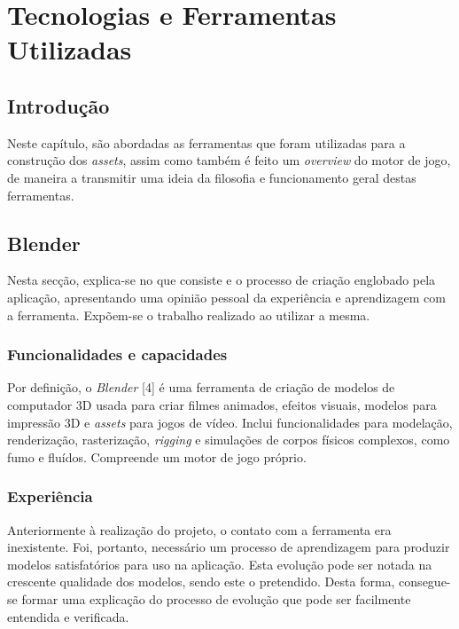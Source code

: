 \chapter{Tecnologias e Ferramentas Utilizadas}
\label{chap:tecnologias_ferramentas_utilizadas}

\section{Introdução}
\label{chap3:sec:intro}
Neste capítulo, são abordadas as ferramentas que foram utilizadas para a construção dos \textit{assets}, assim como também é feito um \textit{overview} do motor de jogo, de maneira a transmitir uma ideia da filosofia e funcionamento geral destas ferramentas.


\section{Blender}
\label{chap3:sec:blender}
Nesta secção, explica-se no que consiste e o processo de criação englobado pela aplicação, apresentando uma opinião pessoal da experiência e aprendizagem com a ferramenta. Expõem-se o trabalho realizado ao utilizar a mesma.

\subsection{Funcionalidades e capacidades}
\label{chap3:subsec:funcionalidades}
Por definição, o \emph{Blender} [4] é uma ferramenta de criação de modelos de computador 3D usada para criar filmes animados, efeitos visuais, modelos para impressão 3D e \textit{assets} para jogos de vídeo.
Inclui funcionalidades para modelação, renderização, rasterização, \textit{rigging} e simulações de corpos físicos complexos, como fumo e fluídos. Compreende um motor de jogo próprio.

\subsection{Experiência}
\label{chap3:subsec:experiencia}
Anteriormente à realização do projeto, o contato com a ferramenta era inexistente. Foi, portanto, necessário um processo de aprendizagem para produzir modelos satisfatórios para uso na aplicação. Esta evolução pode ser notada na crescente qualidade dos modelos, sendo este o pretendido. Desta forma, consegue-se formar uma explicação do processo de evolução que pode ser facilmente entendida e verificada.\\


